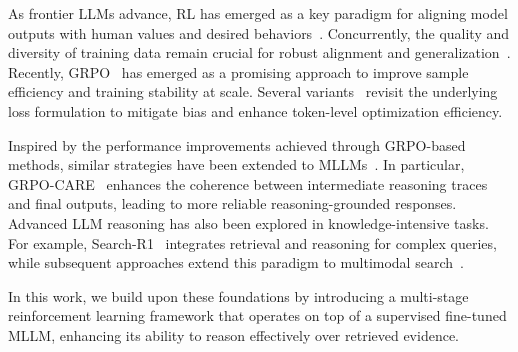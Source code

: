 As frontier LLMs advance, RL has emerged as a key paradigm for aligning model outputs with human values and desired behaviors~\cite{ouyang2022training,lee2023rlaif,rafailov2023direct}. Concurrently, the quality and diversity of training data remain crucial for robust alignment and generalization~\cite{zhou2023lima}.
Recently, GRPO~\cite{shao2024deepseekmath} has emerged as a promising approach to improve sample efficiency and training stability at scale. Several variants~\cite{yu2025dapo,liu2025understanding} revisit the underlying loss formulation to mitigate bias and enhance token-level optimization efficiency.

Inspired by the performance improvements achieved through GRPO-based methods, similar strategies have been extended to MLLMs~\cite{li2025self,wei2025unsupervised}. In particular, GRPO-CARE~\cite{chen2025grpo} enhances the coherence between intermediate reasoning traces and final outputs, leading to more reliable reasoning-grounded responses. Advanced LLM reasoning has also been explored in knowledge-intensive tasks. For example, Search-R1~\cite{jin2025search} integrates retrieval and reasoning for complex queries, while subsequent approaches extend this paradigm to multimodal search~\cite{jiang2024mmsearch,narayan2025deepmmsearch,wu2025mmsearch}.

In this work, we build upon these foundations by introducing a multi-stage reinforcement learning framework that operates on top of a supervised fine-tuned MLLM, enhancing its ability to reason effectively over retrieved evidence.
